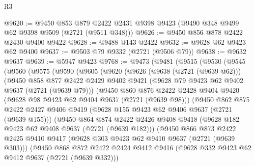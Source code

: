 \begin{lexlean}{R3}
\begin{coremodule}
@9620 := @9450
    @853
    @879
    @2422
    @2431
    @9398
    @9423
    (@9490 @348 @9499 @62 @9398 @9509 (@2721 (@9511 @348)))
@9626 := @9450 @856 @878 @2422 @2430 @9400 @9422
@9628 := @9488 @143 @2422
@9632 := @9628 @62 @9423 @62 @9400
@9637 := @9503 @79 @9332 (@2721 (@9506 @79))
@9638 := @9632 @9637
@9639 := @5947 @9423
@9768 := @9473
    (@9481
      (@9515
        (@9530
          (@9545
            (@9560
              (@9575
                (@9590
                  (@9605
                    (@9620
                      (@9626
                        (@9638 (@2721 (@9639 @62)))
                        (@9450
                          @858
                          @877
                          @2422
                          @2429
                          @9402
                          @9421
                          (@9628 @79 @9423 @62 @9402 @9637 (@2721 (@9639 @79)))
                          (@9450
                            @860
                            @876
                            @2422
                            @2428
                            @9404
                            @9420
                            (@9628 @98 @9423 @62 @9404 @9637 (@2721 (@9639 @98)))
                            (@9450
                              @862
                              @875
                              @2422
                              @2427
                              @9406
                              @9419
                              (@9628 @155 @9423 @62 @9406 @9637 (@2721 (@9639 @155)))
                              (@9450
                                @864
                                @874
                                @2422
                                @2426
                                @9408
                                @9418
                                (@9628 @182 @9423 @62 @9408 @9637 (@2721 (@9639 @182)))
                                (@9450
                                  @866
                                  @873
                                  @2422
                                  @2425
                                  @9410
                                  @9417
                                  (@9628 @303 @9423 @62 @9410 @9637 (@2721 (@9639 @303)))
                                  (@9450
                                    @868
                                    @872
                                    @2422
                                    @2424
                                    @9412
                                    @9416
                                    (@9628 @332 @9423 @62 @9412 @9637 (@2721 (@9639 @332)))

\end{coremodule}
\end{lexlean}
